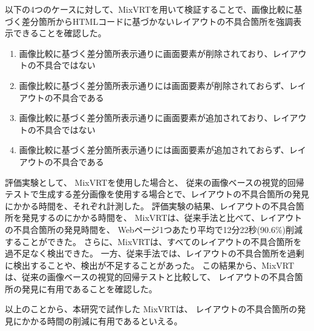\documentclass[uplatex, report, a4j, 10pt]{jsbook}
\newcommand{\toolName}{MixVRT}  %
\begin{document}
\par
以下の4つのケースに対して、\toolName を用いて検証することで、画像比較に基づく差分箇所からHTMLコードに基づかないレイアウトの不具合箇所を強調表示できることを確認した。
\begin{enumerate}[label=ケース\arabic*., leftmargin=1.8cm]
      \setlength{\itemsep}{0pt}
            \setlength{\parsep}{0pt}
      \item 画像比較に基づく差分箇所表示通りに画面要素が削除されており、レイアウトの不具合ではない
      \item 画像比較に基づく差分箇所表示通りには画面要素が削除されておらず、レイアウトの不具合である
      \item 画像比較に基づく差分箇所表示通りに画面要素が追加されており、レイアウトの不具合ではない
      \item 画像比較に基づく差分箇所表示通りには画面要素が追加されておらず、レイアウトの不具合である
\end{enumerate}
\par
評価実験として、
\toolName を使用した場合と、
従来の画像ベースの視覚的回帰テストで生成する差分画像を使用する場合とで、レイアウトの不具合箇所の発見にかかる時間を、それぞれ計測した。
評価実験の結果、レイアウトの不具合箇所を発見するのにかかる時間を、
\toolName は、従来手法と比べて、レイアウトの不具合箇所の発見時間を、
Webページ1つあたり平均で12分22秒(90.6\%)削減することができた。
さらに、\toolName は、すべてのレイアウトの不具合箇所を過不足なく検出できた。
一方、従来手法では、レイアウトの不具合箇所を過剰に検出することや、検出が不足することがあった。
この結果から、\toolName は、従来の画像ベースの視覚的回帰テストと比較して、
レイアウトの不具合箇所の発見に有用であることを確認した。
\par
以上のことから、本研究で試作した \toolName は、
レイアウトの不具合箇所の発見にかかる時間の削減に有用であるといえる。


%
% 








%


%

\end{document}

